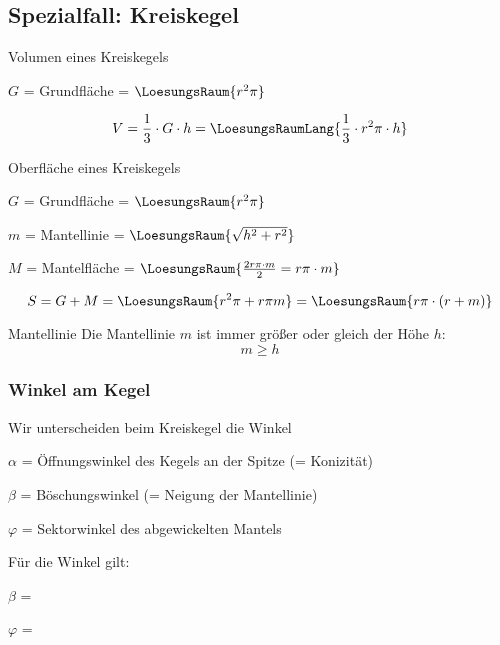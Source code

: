 \subsection{Spezialfall: Kreiskegel}



\begin{gesetz}{Volumen eines Kreiskegels}{}

  $G$ = Grundfläche = $\LoesungsRaum{r^2\pi}$

  $$V = \frac13\cdot{} G\cdot{}h = \LoesungsRaumLang{\frac13 \cdot{} r^2\pi \cdot{} h}$$
\end{gesetz}



\begin{gesetz}{Oberfläche eines Kreiskegels}{}

  $G$ = Grundfläche = $\LoesungsRaum{r^2\pi}$

  $m$ = Mantellinie = $\LoesungsRaum{\sqrt{h^2 + r^2}}$
  
  $M$ = Mantelfläche = $\LoesungsRaum{\frac{2r\pi \cdot{} m}2 = r\pi\cdot{}m}$
  
  $$S = G + M = \LoesungsRaum{r^2\pi + r\pi m} = \LoesungsRaum{r\pi\cdot{}(r+m)}$$
\end{gesetz}


\begin{bemerkung}{Mantellinie}{}
  Die Mantellinie $m$ ist immer größer oder gleich der Höhe $h$:
  $$m \ge{} h$$
\end{bemerkung}

\newpage

\subsubsection{Winkel am Kegel}
\begin{bemerkung}{}{}
  Wir unterscheiden beim Kreiskegel die Winkel

  $\alpha$ = Öffnungswinkel des Kegels an der Spitze (= Konizität)

  $\beta$ = Böschungswinkel (= Neigung der Mantellinie)

  $\varphi$ = Sektorwinkel des abgewickelten Mantels
\end{bemerkung}

\begin{gesetz}{}{}
  Für die Winkel gilt:

  $\beta$ = 

  $\varphi$ = \LoesungsRaumLang{$360\degre \cdot \sin\left(\frac{\alpha}2\right)$}
\end{gesetz}



